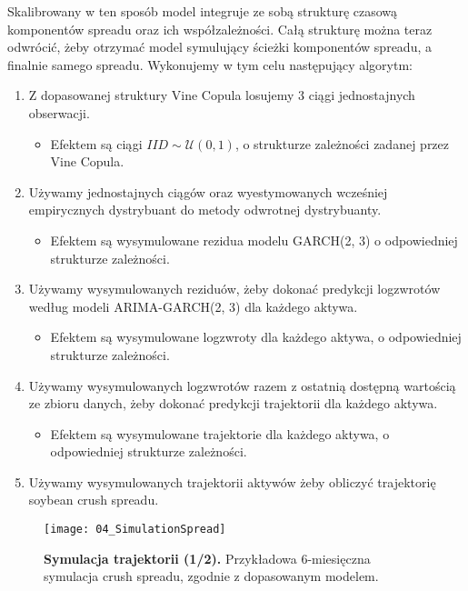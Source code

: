Skalibrowany w ten sposób model integruje ze sobą strukturę czasową komponentów spreadu oraz ich współzależności. Całą strukturę można teraz odwrócić, żeby otrzymać model symulujący ścieżki komponentów spreadu, a finalnie samego spreadu. Wykonujemy w tym celu następujący algorytm:
\begin{enumerate}
	\item Z dopasowanej struktury Vine Copula losujemy 3 ciągi jednostajnych obserwacji.
	\begin{itemize}
		\item Efektem są ciągi $IID\sim\mathcal{U}(0, 1)$, o strukturze zależności zadanej przez Vine Copula.
	\end{itemize}
	\item Używamy jednostajnych ciągów oraz wyestymowanych wcześniej empirycznych dystrybuant do metody odwrotnej dystrybuanty.
	\begin{itemize}
		\item Efektem są wysymulowane rezidua modelu GARCH(2, 3) o odpowiedniej strukturze zależności.
	\end{itemize}
	\item Używamy wysymulowanych reziduów, żeby dokonać predykcji logzwrotów według modeli ARIMA-GARCH(2, 3) dla każdego aktywa. 
	\begin{itemize}
		\item Efektem są wysymulowane logzwroty dla każdego aktywa, o odpowiedniej strukturze zależności.
	\end{itemize}
	\item Używamy wysymulowanych logzwrotów razem z ostatnią dostępną wartością ze zbioru danych, żeby dokonać predykcji trajektorii dla każdego aktywa. 
	\begin{itemize}
		\item Efektem są wysymulowane trajektorie dla każdego aktywa, o odpowiedniej strukturze zależności.
	\end{itemize}
	\item Używamy wysymulowanych trajektorii aktywów żeby obliczyć trajektorię soybean crush spreadu.
	
\end{enumerate}
\begin{figure}[h]
	\centering
	\texttt{[image: 04\_SimulationSpread]}
	\caption{\textbf{Symulacja trajektorii (1/2).} Przykładowa $6$-miesięczna symulacja crush spreadu, zgodnie z dopasowanym modelem.\label{fig:simulation_spread}}
\end{figure}

